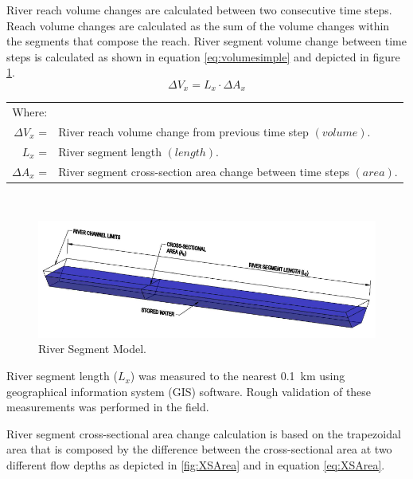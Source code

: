 \begin{linenumbers}
River reach volume changes are calculated between two consecutive time steps.  Reach volume changes are calculated as the sum of the volume changes within the segments that compose the reach.  River segment volume change between time steps is calculated as shown in equation \ref{eq:volumesimple} and depicted in figure \ref{fig:segment model}.
\begin{equation}
	\Delta V_x=L_x \cdot \Delta A_{x}
	\label{eq:volumesimple}
\end{equation}
\begin{tabular}{r l}
	Where:&\\
	$\Delta V_x$ =&River reach volume change from previous time step $(volume)$.\\
	$L_x$ =&River segment length $(length)$.\\
	$\Delta A_{x}$ =& River segment cross-section area change between time steps $(area)$.\\
\end{tabular}\\

\begin{figure}[htbp]
	\begin{center}
		\includegraphics[scale=1]{"Figures/SEGMENT small"}
		\caption[River Segment Model.]{River Segment Model.}
		\label{fig:segment model}
	\end{center}
\end{figure}

River segment length ($L_x$) was measured to the nearest \SI{0.1}{\kilo\meter} using geographical information system (GIS) software.  Rough validation of these measurements was performed in the field.

River segment cross-sectional area change calculation is based on the trapezoidal area that is composed by the difference between the cross-sectional area at two different flow depths as depicted in \ref{fig:XSArea} and in equation \ref{eq:XSArea}.


\end{linenumbers}
